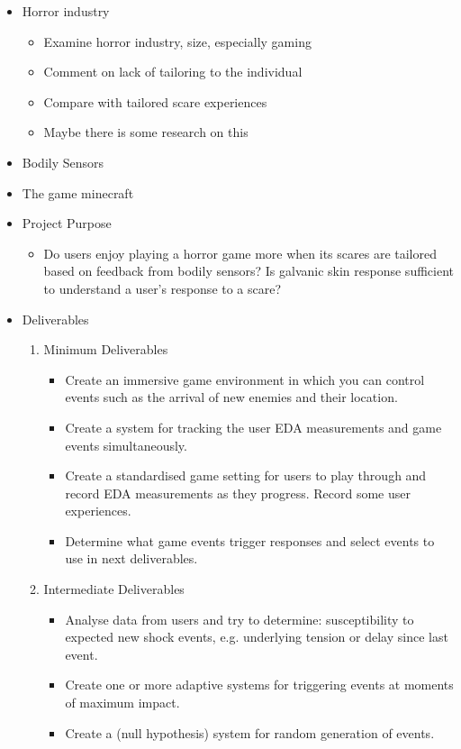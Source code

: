 \documentclass[12pt,a4paper]{article}
\begin{document}
	\begin{itemize}
		\item Horror industry
		\begin{itemize}
			\item Examine horror industry, size, especially gaming
			\item Comment on lack of tailoring to the individual
			\item Compare with tailored scare experiences
			\item Maybe there is some research on this
		\end{itemize}
	
		\item Bodily Sensors
		
		\item The game minecraft
		
		\item Project Purpose
		\begin{itemize}
			\item Do users enjoy playing a horror game more when its scares are tailored based on feedback from bodily sensors? Is galvanic skin response sufficient to understand a user's response to a scare?
		\end{itemize}
		
		\item Deliverables
		\begin{enumerate}
			\item Minimum Deliverables
			\begin{itemize}
				\item Create an immersive game environment in which you can control events such as the arrival of new enemies and their location.
				\item Create a system for tracking the user EDA measurements and game events simultaneously.
				\item Create a standardised game setting for users to play through and record EDA measurements as they progress. Record some user experiences.
				\item Determine what game events trigger responses and select events to use in next deliverables.
			\end{itemize}
			
			\item Intermediate Deliverables
			\begin{itemize}
				\item Analyse data from users and try to determine: susceptibility to expected new shock events, e.g. underlying tension or delay since last event.
				\item Create one or more adaptive systems for triggering events at moments of maximum impact.
				\item Create a (null hypothesis) system for random generation of events.
			\end{itemize}
			

\end{enumerate}
\end{itemize}
\end{document}
